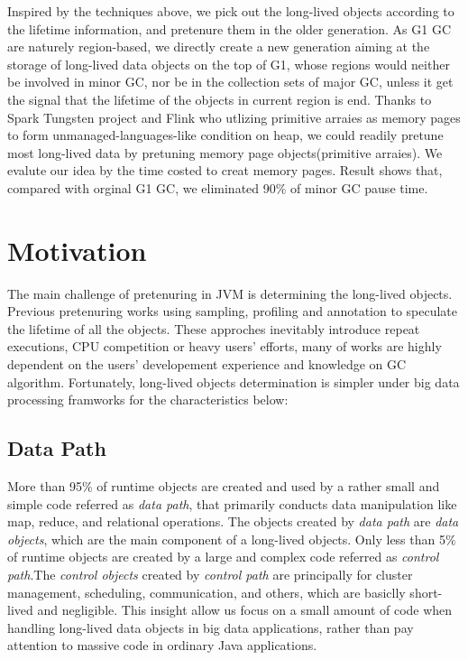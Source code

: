 \documentclass[sigplan, screen]{acmart}
\begin{document}
Inspired by the techniques above, we pick out the long-lived objects according to the lifetime information, and pretenure them in the older generation. As G1 GC are naturely region-based,
we directly create a new generation aiming at the storage of long-lived data objects on the top of G1, whose regions would neither be involved in minor GC, nor be in the collection sets of major GC, unless it get the signal that the lifetime of the objects in current region is end. 
Thanks to Spark Tungsten\cite{Tungsten} project and Flink who utlizing primitive arraies as memory
pages to form unmanaged-languages-like condition on heap, we could readily pretune most long-lived data by pretuning memory page objects(primitive arraies). We evalute our idea 
by the time costed to creat memory pages. Result shows that, compared with orginal G1 GC, we eliminated 90$\%$ of minor GC pause time.

\section{Motivation}
The main challenge of pretenuring in JVM is determining the long-lived objects. Previous pretenuring works using sampling\cite{harris2000dynamic,jump2004dynamic}, profiling\cite{blackburn2001pretenuring,bruno2019runtime,bruno2017polm2} 
and annotation\cite{bruno2017ng2c} to speculate the lifetime of all the objects. These approches inevitably introduce repeat executions, CPU competition or heavy users' efforts, many of works are highly dependent on the users' developement experience
and knowledge on GC algorithm. Fortunately, long-lived objects determination is simpler under big data processing framworks for the characteristics below:

\subsection{Data Path}

More than 95$\%$ of runtime objects are created and used by a rather small and simple code referred as \emph{data path}, that primarily conducts data manipulation like map, 
reduce, and relational operations. The objects created by \emph{data path} are \emph{data objects}, which are the main component of a long-lived objects. Only less than 5$\%$
 of runtime objects are created by a large and complex code referred as \emph{control path}.The \emph{control objects} created by \emph{control path} are principally 
 for cluster management, scheduling, communication, and others, which are basiclly short-lived and negligible\cite{nguyen2015facade,navasca2019gerenuk,bu2013bloat,nguyen2016yak}. This insight
 allow us focus on a small amount of code when handling long-lived data objects in big data applications, rather than pay attention to massive code in ordinary Java applications.
\end{document}
